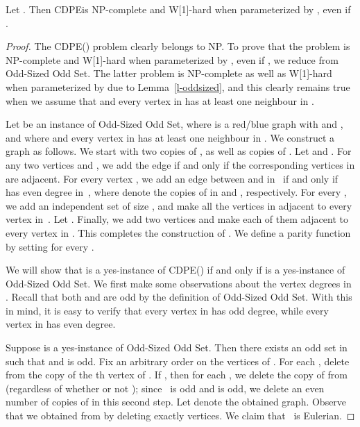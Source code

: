 \documentclass[11pt]{llncs}
\newcommand{\cdpe}{{\sc CDPE}}
\newcommand{\NP}{{\sf NP}}
\newcommand{\W}{{\sf W[1]}}
\begin{document}
\begin{sloppypar}
\begin{theorem}\label{thm:vertex-undir}
Let . Then \cdpe is
\NP-complete and \W-hard when parameterized by , even if
.
\end{theorem}
\end{sloppypar}

\begin{proof}
The \cdpe() problem clearly belongs to \NP. To prove that the problem
is \NP-complete and \W-hard when parameterized by , even if
, we reduce from {\sc Odd-Sized Odd Set}. The latter problem is
\NP-complete as well as \W-hard when parameterized by  due to
Lemma~\ref{l-oddsized}, and this clearly remains true when we assume that
 and every vertex in  has at least one neighbour in
.

\begin{sloppypar}
Let  be an instance of {\sc Odd-Sized Odd Set}, where  is a red/blue graph with  and , and where  and every vertex in  has at least one neighbour in . We construct a graph  as
follows. We start with two copies  of , as
well as  copies  of . Let  and .
For any two vertices  and , we add the edge
 if and only if the corresponding vertices in  are adjacent. For every
vertex , we add an edge between  and  in~ if and
only if  has even degree in~, where  denote the copies of  in
 and , respectively. For every ,
we add an independent set  
of size , and make all the vertices in  adjacent to every
vertex in~. Let . Finally,
we add two vertices  and make each of them adjacent to every vertex in
. This completes the construction of . We define a parity
function  by setting  for every
.
\end{sloppypar}

We will show that  is a yes-instance of \cdpe() if and only
if  is a yes-instance of {\sc Odd-Sized Odd Set}. We first make some
observations about the vertex degrees in . Recall that both 
and  are odd by the definition of {\sc Odd-Sized Odd Set}. With this in
mind, it is easy to verify that every vertex in  has
odd degree, while every vertex in  has even degree.

Suppose  is a yes-instance of {\sc Odd-Sized Odd Set}. Then there exists
an odd set  in  such that  and  is odd.
Fix an arbitrary order on the vertices of . For each , delete from  the copy of the th vertex of
. If , then for each , we delete the copy of
 from  (regardless of whether or not ); since~
is odd and  is odd, we delete an even number of copies of 
in this second step. Let  denote the obtained graph. Observe that we
obtained  from  by deleting exactly  vertices. We claim that~
is Eulerian.


\end{proof}
\end{document}
